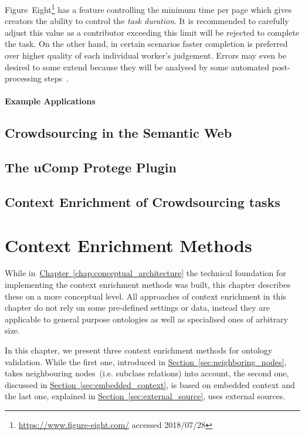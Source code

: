 \documentclass[draft,final]{vutinfth} %
\begin{document}
Figure~Eight\footnote{\url{https://www.figure-eight.com/} accessed 2018/07/28} has a feature controlling the minimum time per page which gives creators the ability to control the \emph{task duration}. It is recommended to carefully adjust this value as a contributor exceeding this limit will be rejected to complete the task. On the other hand, in certain scenarios faster completion is preferred over higher quality of each individual worker's judgement. Errors may even be desired to some extend because they will be analysed by some automated post-processing steps~\cite{krishna2016}. 

\subsubsection{Example Applications}


\section{Crowdsourcing in the Semantic Web}
\section{The uComp Protege Plugin}\label{sec:ucomp_protege_plugin}
\section{Context Enrichment of Crowdsourcing tasks}



\chapter{Context Enrichment Methods}\label{chap:context_enrichment_methods}
While in~\hyperref[chap:conceptual_architecture]{Chapter~\ref*{chap:conceptual_architecture}} the technical foundation for implementing the context enrichment methods was built, this chapter describes these on a more conceptual level. All approaches of context enrichment in this chapter do not rely on some pre-defined settings or data, instead they are applicable to general purpose ontologies as well as specialised ones of arbitrary size.

In this chapter, we present three context enrichment methods for ontology validation. While the first one, introduced in \hyperref[sec:neighboring_nodes]{Section~\ref*{sec:neighboring_nodes}}, takes neighbouring nodes~(i.e. subclass relations) into account, the second one, discussed in \hyperref[sec:embedded_context]{Section~\ref*{sec:embedded_context}}, is based on embedded context and the last one, explained in \hyperref[sec:external_source]{Section~\ref*{sec:external_source}}, uses external sources. 
\end{document}
